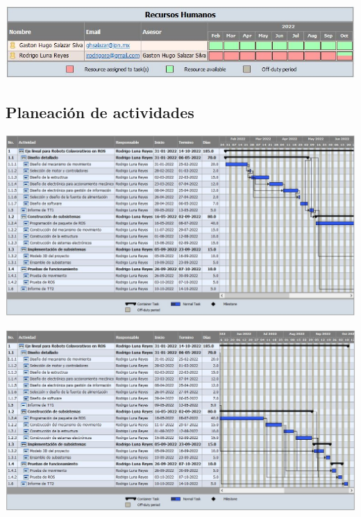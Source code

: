 \begin{center}
    \includegraphics[scale=0.7]{imagenes/recursos_humanos_TT.JPG}
    \label{fig:recursos_humanos}
\end{center}

\subsection{Planeación de actividades}
\begin{center}
    \includegraphics[scale=0.6]{imagenes/Cronograma TT1.JPG}
    \label{fig:cronograma_tt1}
\end{center}
\begin{center}
    \includegraphics[scale=0.6]{imagenes/Cronograma TT2.JPG}
    \label{fig:cronograma_tt2}
\end{center}
